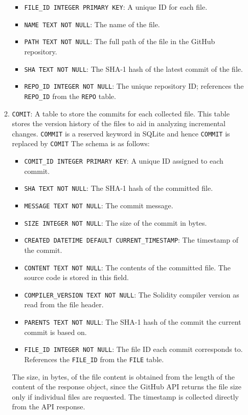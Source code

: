 \documentclass[10pt,conference]{IEEEtran}
\begin{document}
\begin{itemize}
\begin{enumerate}
\begin{itemize}
				\item \texttt{FILE\_ID INTEGER PRIMARY KEY}: A unique ID for each file.
				\item \texttt{NAME TEXT NOT NULL}: The name of the file.
				\item \texttt{PATH TEXT NOT NULL}: The full path of the file in the GitHub repository.
				\item \texttt{SHA TEXT NOT NULL}: The SHA-1 hash of the latest commit of the file.
				\item \texttt{REPO\_ID INTEGER NOT NULL}: The unique repository ID; references the \texttt{REPO\_ID} from the \texttt{REPO} table.
			\end{itemize}
			\item \texttt{COMIT}: A table to store the commits for each collected file. This table stores the version history of the files to aid in analyzing incremental changes. \texttt{COMMIT} is a reserved keyword in SQLite and hence \texttt{COMMIT} is replaced by \texttt{COMIT} The schema is as follows:
			\begin{itemize}
				\item \texttt{COMIT\_ID INTEGER PRIMARY KEY}: A unique ID assigned to each commit.
				\item \texttt{SHA TEXT NOT NULL}: The SHA-1 hash of the committed file.
				\item \texttt{MESSAGE TEXT NOT NULL}: The commit message.
				\item \texttt{SIZE INTEGER NOT NULL}: The size of the commit in bytes.
				\item \texttt{CREATED DATETIME DEFAULT CURRENT\_TIMESTAMP}: The timestamp of the commit.
				\item \texttt{CONTENT TEXT NOT NULL}: The contents of the committed file. The source code is stored in this field.
				\item \texttt{COMPILER\_VERSION TEXT NOT NULL}: The Solidity compiler version as read from the file header.
				\item \texttt{PARENTS TEXT NOT NULL}: The SHA-1 hash of the commit the current commit is based on.
				\item \texttt{FILE\_ID INTEGER NOT NULL}: The file ID each commit corresponds to. References the \texttt{FILE\_ID} from the \texttt{FILE} table.
			\end{itemize}
			The size, in bytes, of the file content is obtained from the length of the content of the response object, since the GitHub API returns the file size only if individual files are requested. The timestamp is collected directly from the API response.
		\end{enumerate}
		
	\end{itemize}
	
\end{document}
